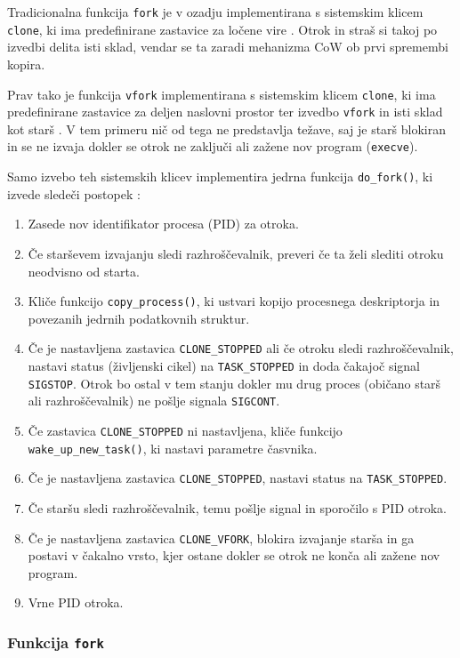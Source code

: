 \documentclass[a4paper,12pt,openright]{book}
\begin{document}
Tradicionalna funkcija \texttt{fork} je v ozadju implementirana s sistemskim klicem \texttt{clone}, ki ima predefinirane zastavice za ločene vire \cite{Bovet_Cesati_2005}.
Otrok in straš si takoj po izvedbi delita isti sklad, vendar se ta zaradi mehanizma CoW ob prvi spremembi kopira.

Prav tako je funkcija \texttt{vfork} implementirana s sistemskim klicem \texttt{clone}, ki ima predefinirane zastavice za deljen naslovni prostor ter izvedbo \texttt{vfork} in isti sklad kot starš \cite{Bovet_Cesati_2005}.
V tem primeru nič od tega ne predstavlja težave, saj je starš blokiran in se ne izvaja dokler se otrok ne zaključi ali zažene nov program (\texttt{execve}).

Samo izvebo teh sistemskih klicev implementira jedrna funkcija \texttt{do\_fork()}, ki izvede sledeči postopek \cite{Bovet_Cesati_2005}:
\begin{enumerate}
	\item Zasede nov identifikator procesa (PID) za otroka.
	\item Če starševem izvajanju sledi razhroščevalnik, preveri če ta želi slediti otroku neodvisno od starta.
	\item Kliče funkcijo \texttt{copy\_process()}, ki ustvari kopijo procesnega deskriptorja in povezanih jedrnih podatkovnih struktur.
	\item Če je nastavljena zastavica \texttt{CLONE\_STOPPED} ali če otroku sledi razhroščevalnik, nastavi status (življenski cikel) na \texttt{TASK\_STOPPED} in doda čakajoč signal \texttt{SIGSTOP}.
	      Otrok bo ostal v tem stanju dokler mu drug proces (običano starš ali razhroščevalnik) ne pošlje signala \texttt{SIGCONT}.
	\item Če zastavica \texttt{CLONE\_STOPPED} ni nastavljena, kliče funkcijo \texttt{wake\_up\_new\-\_task()}, ki nastavi parametre časvnika.
	\item Če je nastavljena zastavica \texttt{CLONE\_STOPPED}, nastavi status na \texttt{TASK\-\_STOPPED}.
	\item Če staršu sledi razhroščevalnik, temu pošlje signal in sporočilo s PID otroka.
	\item Če je nastavljena zastavica \texttt{CLONE\_VFORK}, blokira izvajanje starša in ga postavi v čakalno vrsto, kjer ostane dokler se otrok ne konča ali zažene nov program.
	\item Vrne PID otroka.
\end{enumerate}

\subsubsection{Funkcija \texttt{fork}}
\end{document}
